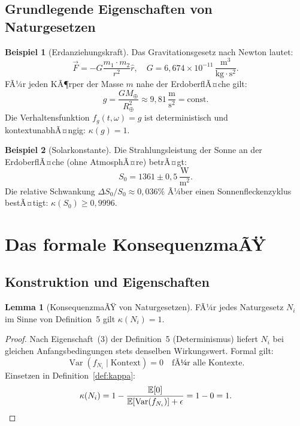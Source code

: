 ﻿\documentclass[a4paper,12pt]{article}
\DeclareMathOperator{\Var}{Var}
\theoremstyle{definition}
\newtheorem{beispiel}{Beispiel}
\newtheorem{lemma}{Lemma}
\begin{document}
\subsection{Grundlegende Eigenschaften von Naturgesetzen}

\begin{beispiel}[Erdanziehungskraft]
Das Gravitationsgesetz nach Newton lautet:
\[
\vec{F} = -G \frac{m_1 \cdot m_2}{r^2} \hat{r}, \quad G = 6{,}674 \times 10^{-11}\, \frac{\text{m}^3}{\text{kg} \cdot \text{s}^2}.
\]
FÃ¼r jeden KÃ¶rper der Masse $m$ nahe der ErdoberflÃ¤che gilt:
\[
g = \frac{GM_{\oplus}}{R_{\oplus}^2} \approx 9{,}81\, \frac{\text{m}}{\text{s}^2} = \text{const}.
\]
Die Verhaltensfunktion $f_g(t, \omega) = g$ ist deterministisch und kontextunabhÃ¤ngig: $\kappa(g) = 1$.
\end{beispiel}

\begin{beispiel}[Solarkonstante]
Die Strahlungsleistung der Sonne an der ErdoberflÃ¤che (ohne AtmosphÃ¤re) betrÃ¤gt:
\[
S_0 = 1361 \pm 0{,}5\, \frac{\text{W}}{\text{m}^2}.
\]
Die relative Schwankung $\Delta S_0 / S_0 \approx 0{,}036\%$ Ã¼ber einen Sonnenfleckenzyklus bestÃ¤tigt: $\kappa(S_0) \geq 0{,}9996$.
\end{beispiel}

\section{Das formale KonsequenzmaÃŸ}

\subsection{Konstruktion und Eigenschaften}

\begin{lemma}[KonsequenzmaÃŸ von Naturgesetzen]
\label{lem:nl_kappa}
FÃ¼r jedes Naturgesetz $N_i$ im Sinne von Definition~5 gilt $\kappa(N_i) = 1$.
\end{lemma}

\begin{proof}
Nach Eigenschaft~(3) der Definition~5 (Determinismus) liefert $N_i$ bei gleichen Anfangsbedingungen stets denselben Wirkungswert. Formal gilt:
\[
\Var(f_{N_i} \mid \text{Kontext}) = 0 \quad \text{fÃ¼r alle Kontexte.}
\]
Einsetzen in Definition~\ref{def:kappa}:
\[
\kappa(N_i) = 1 - \frac{\mathbb{E}[0]}{\mathbb{E}[\Var(f_{N_i})] + \epsilon} = 1 - 0 = 1. \qedhere
\]
\end{proof}
\end{document}
